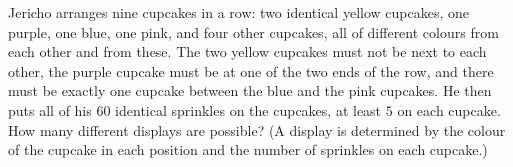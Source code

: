Jericho arranges nine cupcakes in a row: two identical yellow cupcakes, one purple, one blue, one pink, and four other cupcakes, all of different colours from each other and from these. The two yellow cupcakes must not be next to each other, the purple cupcake must be at one of the two ends of the row, and there must be exactly one cupcake between the blue and the pink cupcakes. He then puts all of his $60$ identical sprinkles on the cupcakes, at least $5$ on each cupcake. How many different displays are possible? (A display is determined by the colour of the cupcake in each position and the number of sprinkles on each cupcake.)

